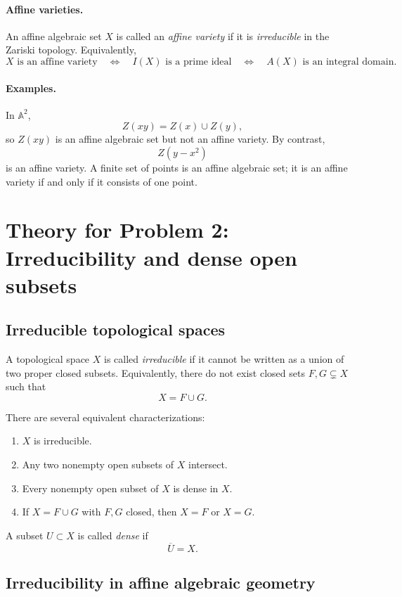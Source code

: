 \documentclass[12pt,a4paper]{article}
\theoremstyle{plain}
\theoremstyle{definition}      %
\begin{document}
\paragraph{Affine varieties.}
An affine algebraic set $X$ is called an \emph{affine variety} if it is \emph{irreducible} in the Zariski topology.
Equivalently,
\[
X \text{ is an affine variety}
\quad\Longleftrightarrow\quad
I(X) \text{ is a prime ideal}
\quad\Longleftrightarrow\quad
A(X) \text{ is an integral domain}.
\]

\paragraph{Examples.}
In $\mathbb A^2$,
\[
Z(xy)
=
Z(x)\cup Z(y),
\]
so $Z(xy)$ is an affine algebraic set but not an affine variety.
By contrast,
\[
Z(y-x^2)
\]
is an affine variety.
A finite set of points is an affine algebraic set; it is an affine variety if and only if it consists of one point.


\section*{Theory for Problem 2: Irreducibility and dense open subsets}

\subsection*{Irreducible topological spaces}

A topological space $X$ is called \emph{irreducible} if it cannot be written as a union of two proper closed subsets.
Equivalently, there do not exist closed sets $F,G\subsetneq X$ such that
\[
X=F\cup G.
\]

There are several equivalent characterizations:

\begin{enumerate}
	\item $X$ is irreducible.
	\item Any two nonempty open subsets of $X$ intersect.
	\item Every nonempty open subset of $X$ is dense in $X$.
	\item If $X=F\cup G$ with $F,G$ closed, then $X=F$ or $X=G$.
\end{enumerate}

A subset $U\subset X$ is called \emph{dense} if
\[
\overline{U}=X.
\]

\subsection*{Irreducibility in affine algebraic geometry}
\end{document}
